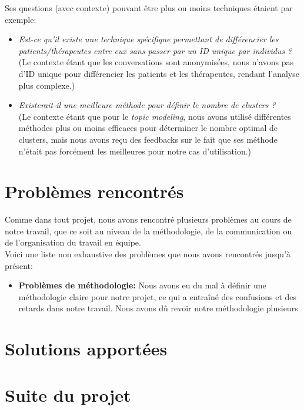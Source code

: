 \documentclass[12pt,a4paper]{article}
\begin{document}
Ses questions (avec contexte) pouvant être plus ou moins techniques étaient par exemple:
\begin{itemize}
  \item \textit{Est-ce qu’il existe une technique spécifique permettant de différencier les patients/thérapeutes entre eux sans passer par un ID unique par individus ?}
                (Le contexte étant que les conversations sont anonymisées, nous n'avons pas d'ID unique pour différencier les patients et les thérapeutes,
                rendant l'analyse plus complexe.)
  \item \textit{Existerait-il une meilleure méthode pour définir le nombre de clusters ?}\\
                (Le contexte étant que pour le \textit{topic modeling}, nous avons utilisé différentes méthodes plus ou moins efficaces pour déterminer le nombre optimal de clusters, 
                mais nous avons reçu des feedbacks sur le fait que ses méthode n'était pas forcément les meilleures pour notre cas d'utilisation.)
\end{itemize}




\pagebreak
\section{Problèmes rencontrés}\label{sec:problems}
Comme dans tout projet, nous avons rencontré plusieurs problèmes au cours de notre travail,
que ce soit au niveau de la méthodologie, de la communication ou de l'organisation du travail en équipe.\\
Voici une liste non exhaustive des problèmes que nous avons rencontrés jusqu'à présent:
\begin{itemize}
  \item \textbf{Problèmes de méthodologie:} Nous avons eu du mal à définir une méthodologie claire pour notre projet, 
  ce qui a entraîné des confusions et des retards dans notre travail. Nous avons dû revoir notre méthodologie plusieurs
\end{itemize}

\pagebreak
\section{Solutions apportées}

\pagebreak
\section{Suite du projet}
\end{document}
